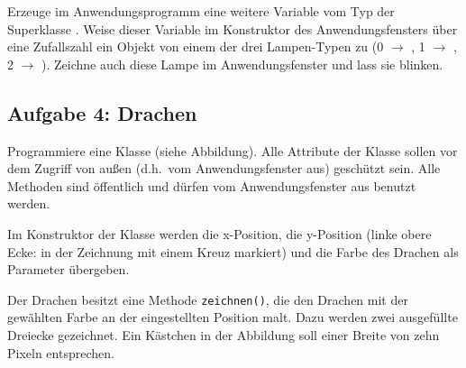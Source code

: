 \begin{compactenum}[a)]
Erzeuge im Anwendungsprogramm eine weitere Variable vom Typ der Superklasse
. Weise dieser Variable im Konstruktor des Anwendungsfensters
über eine Zufallszahl ein Objekt von einem der drei Lampen-Typen zu (0
$\rightarrow$ , 1 $\rightarrow$ , 2
$\rightarrow$ ). Zeichne auch diese Lampe im
Anwendungsfenster und lass sie blinken.
\end{compactenum}


\subsection{Aufgabe 4: Drachen}

\begin{compactenum}[a)]
\begin{minipage}{0.6\textwidth}
\item Programmiere eine Klasse  (siehe Abbildung). Alle
Attribute der Klasse  sollen vor dem Zugriff von außen
(d.h.\ vom Anwendungsfenster aus) geschützt sein. Alle Methoden sind öffentlich
und dürfen vom Anwendungsfenster aus benutzt werden.

Im Konstruktor der Klasse werden die x-Position, die y-Position
(linke obere Ecke: in der Zeichnung mit einem Kreuz markiert) und
die Farbe des Drachen als Parameter übergeben.

Der Drachen besitzt eine Methode \verb|zeichnen()|, die den Drachen
mit der gewählten Farbe an der eingestellten Position malt. Dazu
werden zwei ausgefüllte Dreiecke gezeichnet. Ein Kästchen in der
Abbildung soll einer Breite von zehn Pixeln entsprechen.


\end{minipage}
\end{compactenum}
